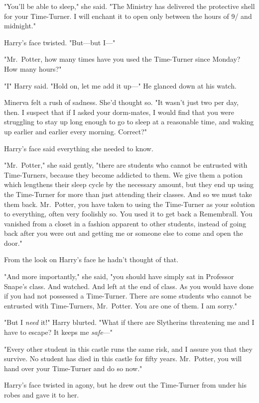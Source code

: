 "You'll be able to sleep," she said. "The Ministry has delivered the protective
shell for your Time-Turner. I will enchant it to open only between the hours of
9\PM/ and midnight."

Harry's face twisted. "But---but I\mbox{---}"

"Mr.~Potter, how many times have you used the Time-Turner since Monday? How
many hours?"

"I{\el}" Harry said. "Hold on, let me add it up\mbox{---}" He glanced down at his
watch.

Minerva felt a rush of sadness. She'd thought so. "It wasn't just two per day,
then. I suspect that if I asked your dorm-mates, I would find that you were
struggling to stay up long enough to go to sleep at a reasonable time, and
waking up earlier and earlier every morning. Correct?"

Harry's face said everything she needed to know.

"Mr.~Potter," she said gently, "there are students who cannot be entrusted with
Time-Turners, because they become addicted to them. We give them a potion which
lengthens their sleep cycle by the necessary amount, but they end up using the
Time-Turner for more than just attending their classes. And so we must take
them back. Mr.~Potter, you have taken to using the Time-Turner as your solution
to everything, often very foolishly so. You used it to get back a Remembrall.
You vanished from a closet in a fashion apparent to other students, instead of
going back after you were out and getting me or someone else to come and open
the door."

From the look on Harry's face he hadn't thought of that.

"And more importantly," she said, "you should have simply sat in Professor
Snape's class. And watched. And left at the end of class. As you would have
done if you had not possessed a Time-Turner. There are some students who cannot
be entrusted with Time-Turners, Mr.~Potter. You are one of them. I am sorry."

"But I \emph{need} it!" Harry blurted. "What if there are Slytherins
threatening me and I have to escape? It keeps me \emph{safe}\mbox{---}"

"Every other student in this castle runs the same risk, and I assure you that
they survive. No student has died in this castle for fifty years. Mr.~Potter,
you will hand over your Time-Turner and do so now."

Harry's face twisted in agony, but he drew out the Time-Turner from under his
robes and gave it to her.

